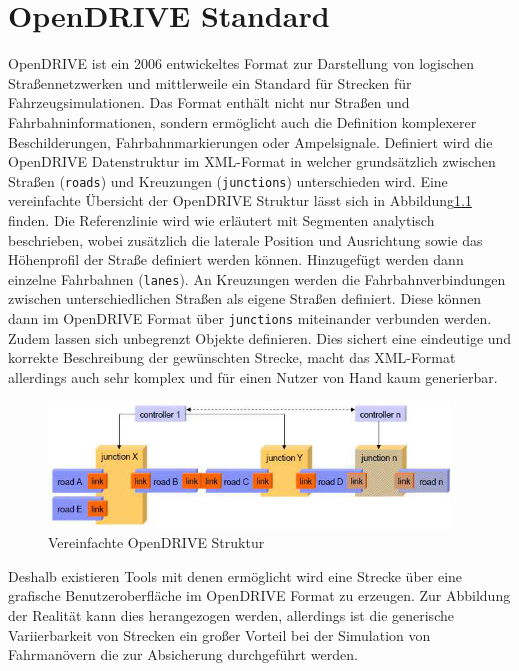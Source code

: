 \chapter{OpenDRIVE Standard}

OpenDRIVE ist ein 2006 entwickeltes Format zur Darstellung von logischen Straßennetzwerken und mittlerweile ein Standard für Strecken für Fahrzeugsimulationen. Das Format enthält nicht nur Straßen und Fahrbahninformationen, sondern ermöglicht auch die Definition komplexerer Beschilderungen, Fahrbahnmarkierungen oder Ampelsignale. Definiert wird die OpenDRIVE Datenstruktur im XML-Format in welcher grundsätzlich zwischen Straßen (\texttt{roads}) und Kreuzungen (\texttt{junctions}) unterschieden wird. Eine vereinfachte Übersicht der OpenDRIVE Struktur lässt sich in Abbildung\ref{abb3} finden. Die Referenzlinie wird wie erläutert mit Segmenten analytisch beschrieben, wobei zusätzlich die laterale Position und Ausrichtung sowie das Höhenprofil der Straße definiert werden können. Hinzugefügt werden dann einzelne Fahrbahnen (\texttt{lanes}). An Kreuzungen werden die Fahrbahnverbindungen zwischen unterschiedlichen Straßen als eigene Straßen definiert. Diese können dann im OpenDRIVE Format über \texttt{junctions} miteinander verbunden werden. Zudem lassen sich unbegrenzt Objekte definieren. Dies sichert eine eindeutige und korrekte Beschreibung der gewünschten Strecke, macht das XML-Format allerdings auch sehr komplex und für einen Nutzer von Hand kaum generierbar.

\begin{figure}[H]
\flushleft
\includegraphics[width=0.95\textwidth]{fig/fig3.png}
\caption{Vereinfachte OpenDRIVE Struktur \cite{Dupuis.2006}}
\label{abb3}
\end{figure}

Deshalb existieren Tools mit denen ermöglicht wird eine Strecke über eine grafische Benutzeroberfläche im OpenDRIVE Format zu erzeugen. Zur Abbildung der Realität kann dies herangezogen werden, allerdings ist die generische Variierbarkeit von Strecken ein großer Vorteil bei der Simulation von Fahrmanövern die zur Absicherung durchgeführt werden.


